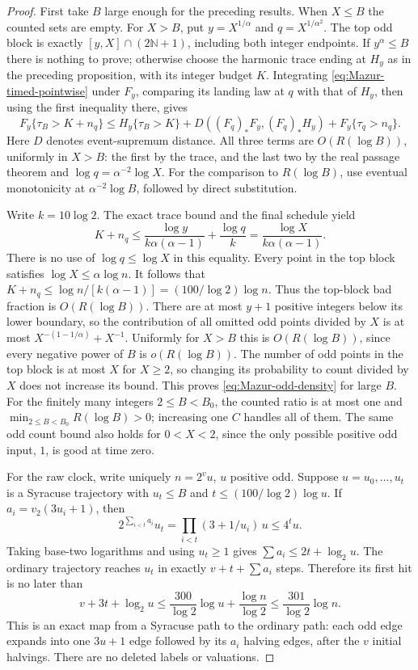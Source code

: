 \begin{proof}
First take \(B\) large enough for the preceding results.
When \(X\le B\) the counted sets are empty.
For \(X>B\), put \(y=X^{1/\alpha}\) and
\(q=X^{1/\alpha^2}\). The top odd block is exactly
\([y,X]\cap(2\mathbb N+1)\), including both integer endpoints.
If \(y^\alpha\le B\) there is nothing to prove; otherwise choose
the harmonic trace ending at \(H_y\) as in the preceding proposition,
with its integer budget \(K\). Integrating
\eqref{eq:Mazur-timed-pointwise} under \(F_y\), comparing its
landing law at \(q\) with that of \(H_y\), then using the first
inequality there, gives
\[
 F_y\{\tau_B>K+n_q\}
 \le H_y\{\tau_B>K\}
    +D((F_q)_*F_y,(F_q)_*H_y)
    +F_y\{\tau_q>n_q\}.
\]
Here \(D\) denotes event-supremum distance. All three terms are
\(O(R(\log B))\), uniformly in \(X>B\): the first by the trace,
and the last two by the real passage theorem and
\(\log q=\alpha^{-2}\log X\).
For the comparison to \(R(\log B)\), use eventual monotonicity at
\(\alpha^{-2}\log B\), followed by direct substitution.

Write \(k=10\log2\). The exact trace bound and the final schedule yield
\[
 K+n_q\le
 \frac{\log y}{k\alpha(\alpha-1)}+\frac{\log q}{k}
 =\frac{\log X}{k\alpha(\alpha-1)}.
\]
There is no use of \(\log q\le\log X\) in this equality.
Every point in the top block satisfies \(\log X\le\alpha\log n\).
It follows that \(K+n_q\le\log n/[k(\alpha-1)]
=(100/\log2)\log n\).
Thus the top-block bad fraction is \(O(R(\log B))\).
There are at most \(y+1\) positive integers below its lower boundary,
so the contribution of all omitted odd points divided by \(X\) is
at most \(X^{-(1-1/\alpha)}+X^{-1}\).
Uniformly for \(X>B\) this is \(O(R(\log B))\), since every negative
power of \(B\) is \(o(R(\log B))\).
The number of odd points in the top block is at most \(X\) for
\(X\ge2\), so changing its probability to count divided by \(X\)
does not increase its bound. This proves \eqref{eq:Mazur-odd-density}
for large \(B\).
For the finitely many integers \(2\le B<B_0\), the counted ratio
is at most one and \(\min_{2\le B<B_0}R(\log B)>0\);
increasing one \(C\) handles all of them. The same odd count bound
also holds for \(0<X<2\), since the only possible positive odd input,
\(1\), is good at time zero.

For the raw clock, write uniquely \(n=2^v u\), \(u\) positive odd.
Suppose \(u=u_0,\ldots,u_t\) is a Syracuse trajectory with \(u_t\le B\)
and \(t\le(100/\log2)\log u\).
If \(a_i=v_2(3u_i+1)\), then
\[
 2^{\sum_{i<t}a_i}u_t=\prod_{i<t}(3+1/u_i)\,u
 \le 4^t u.
\]
Taking base-two logarithms and using \(u_t\ge1\) gives
\(\sum a_i\le2t+\log_2u\). The ordinary trajectory reaches
\(u_t\) in exactly \(v+t+\sum a_i\) steps. Therefore its first
hit is no later than
\[
 v+3t+\log_2u
 \le \frac{300}{\log2}\log u+\frac{\log n}{\log2}
 \le \frac{301}{\log2}\log n.
\]
This is an exact map from a Syracuse path to the ordinary path:
each odd edge expands into one \(3u+1\) edge followed by its
\(a_i\) halving edges, after the \(v\) initial halvings.
There are no deleted labels or valuations.


\end{proof}
